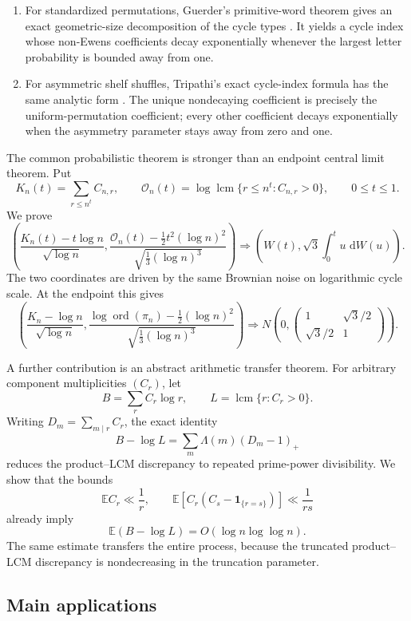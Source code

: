 \documentclass[11pt]{article}
\theoremstyle{definition}
\theoremstyle{remark}
\newcommand{\Ee}{\mathbb E}
\newcommand{\one}{\mathbf 1}
\newcommand{\dd}{\,\mathrm d}
\newcommand{\ord}{\operatorname{ord}}
\newcommand{\lcm}{\operatorname{lcm}}
\newcommand{\cO}{\mathcal O}
\begin{document}
\begin{enumerate}[label=\textnormal{(\roman*)},leftmargin=2.2em]
\item For standardized permutations, Guerder's primitive-word theorem
gives an exact geometric-size decomposition of the cycle types
\cite{Guerder2026}.  It yields a cycle index whose non-Ewens coefficients
decay exponentially whenever the largest letter probability is bounded
away from one.

\item For asymmetric shelf shuffles, Tripathi's exact cycle-index formula
has the same analytic form \cite{Tripathi2026}.  The unique nondecaying
coefficient is precisely the uniform-permutation coefficient; every other
coefficient decays exponentially when the asymmetry parameter stays away
from zero and one.
\end{enumerate}

The common probabilistic theorem is stronger than an endpoint central
limit theorem.  Put
\[
 K_n(t)=\sum_{r\le n^t}C_{n,r},
 \qquad
 \cO_n(t)=\log\lcm\{r\le n^t:C_{n,r}>0\},
 \qquad 0\le t\le1.
\]
We prove
\[
 \left(
 \frac{K_n(t)-t\log n}{\sqrt{\log n}},
 \frac{\cO_n(t)-\frac12t^2(\log n)^2}
      {\sqrt{\frac13(\log n)^3}}
 \right)
 \Rightarrow
 \left(
 W(t),\sqrt3\int_0^t u\,\dd W(u)
 \right).
\]
The two coordinates are driven by the same Brownian noise on logarithmic
cycle scale.  At the endpoint this gives
\[
 \left(
 \frac{K_n-\log n}{\sqrt{\log n}},
 \frac{\log\ord(\pi_n)-\frac12(\log n)^2}
      {\sqrt{\frac13(\log n)^3}}
 \right)
 \Rightarrow
 N\!\left(
 0,
 \begin{pmatrix}
 1&\sqrt3/2\\
 \sqrt3/2&1
 \end{pmatrix}
 \right).
\]

A further contribution is an abstract arithmetic transfer theorem.
For arbitrary component multiplicities $(C_r)$, let
\[
 B=\sum_r C_r\log r,
 \qquad
 L=\lcm\{r:C_r>0\}.
\]
Writing $D_m=\sum_{m\mid r}C_r$, the exact identity
\[
 B-\log L=\sum_m\Lambda(m)(D_m-1)_+
\]
reduces the product--LCM discrepancy to repeated prime-power divisibility.
We show that the bounds
\[
 \Ee C_r\ll\frac1r,
 \qquad
 \Ee\!\left[C_r(C_s-\one_{\{r=s\}})\right]\ll\frac1{rs}
\]
already imply
\[
 \Ee(B-\log L)=O(\log n\log\log n).
\]
The same estimate transfers the entire process, because the truncated
product--LCM discrepancy is nondecreasing in the truncation parameter.

\subsection*{Main applications}
\end{document}

